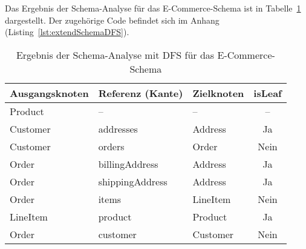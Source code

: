 Das Ergebnis der Schema-Analyse für das E-Commerce-Schema ist in Tabelle~\ref{tab:schema-analyse-dfs} dargestellt. Der zugehörige Code befindet sich im Anhang (Listing~\ref{lst:extendSchemaDFS}).

\begin{table}[H]
  \centering
  \begin{tabular}{lllc}
    \toprule
    \textbf{Ausgangsknoten} & \textbf{Referenz (Kante)} & \textbf{Zielknoten} & \textbf{isLeaf}\\ 
    \midrule
    Product & – & – & – \\[4pt]
    Customer & addresses & Address & Ja \\[4pt]
    Customer & orders & Order & Nein \\[4pt]
    Order & billingAddress & Address & Ja \\[4pt]
    Order & shippingAddress & Address & Ja \\[4pt]
    Order & items & LineItem & Nein \\[4pt]
    LineItem & product & Product & Ja \\[4pt]
    Order & customer & Customer & Nein \\ 
    \bottomrule
  \end{tabular}
  \caption{Ergebnis der Schema-Analyse mit DFS für das E-Commerce-Schema}
  \label{tab:schema-analyse-dfs}
\end{table}


